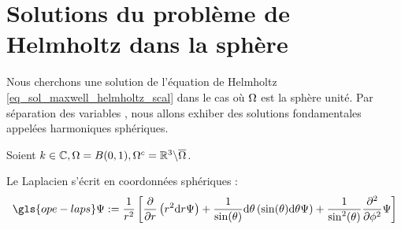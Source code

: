 \section{Solutions du problème de Helmholtz dans la sphère}\label{sec_helmholtz_scal}

Nous cherchons une solution de l'équation de Helmholtz \eqref{eq_sol_maxwell_helmholtz_scal} dans le cas où $\Omega$ est la sphère unité. Par séparation des variables%
, nous allons exhiber des solutions fondamentales appelées harmoniques sphériques.

Soient $k \in \mathbb C, \Omega = B(0,1), \Omega^c = \mathbb R^3 \backslash \overline{\Omega}$. 

Le Laplacien s'écrit en coordonnées sphériques : 
\[ 
  \gls{ope-laps} \Psi := \frac{1}{r^2}\left[
  \frac{\d}{\d r}\left(r^2\dd{r}\Psi\right) 
  + \frac{1}{\sin(\theta)}\dd{\theta}\left(\sin(\theta)\dd{\theta}\Psi\right)
  + \frac{1}{\sin^2(\theta)} \frac{\d^2}{\d\phi^2} \Psi \right]
\]

